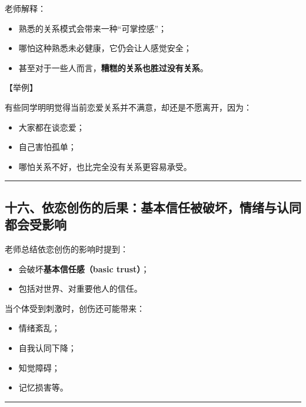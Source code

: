 \documentclass[
  chinese,
  9pt,
  a4paper,
]{ctexart}
\providecommand{\tightlist}{%
  \setlength{\itemsep}{0pt}\setlength{\parskip}{0pt}}
\begin{document}
老师解释：

\begin{itemize}
\tightlist
\item
  熟悉的关系模式会带来一种``可掌控感''；
\item
  哪怕这种熟悉未必健康，它仍会让人感觉安全；
\item
  甚至对于一些人而言，\textbf{糟糕的关系也胜过没有关系}。
\end{itemize}

【举例】

有些同学明明觉得当前恋爱关系并不满意，却还是不愿离开，因为：

\begin{itemize}
\tightlist
\item
  大家都在谈恋爱；
\item
  自己害怕孤单；
\item
  哪怕关系不好，也比完全没有关系更容易承受。
\end{itemize}

\begin{center}\rule{0.5\linewidth}{0.5pt}\end{center}

\subsection{十六、依恋创伤的后果：基本信任被破坏，情绪与认同都会受影响}\label{ux5341ux516dux4f9dux604bux521bux4f24ux7684ux540eux679cux57faux672cux4fe1ux4efbux88abux7834ux574fux60c5ux7eeaux4e0eux8ba4ux540cux90fdux4f1aux53d7ux5f71ux54cd}

老师总结依恋创伤的影响时提到：

\begin{itemize}
\tightlist
\item
  会破坏\textbf{基本信任感（basic trust）}；
\item
  包括对世界、对重要他人的信任。
\end{itemize}

当个体受到刺激时，创伤还可能带来：

\begin{itemize}
\tightlist
\item
  情绪紊乱；
\item
  自我认同下降；
\item
  知觉障碍；
\item
  记忆损害等。
\end{itemize}

\begin{center}\rule{0.5\linewidth}{0.5pt}\end{center}
\end{document}
